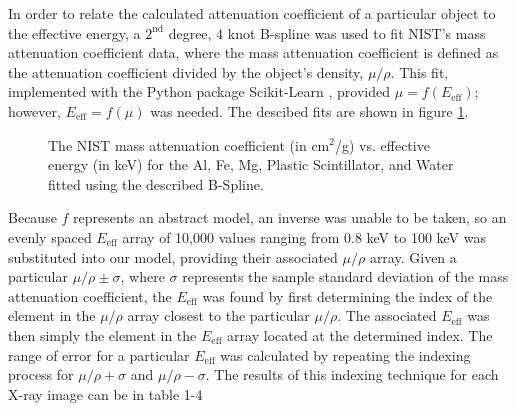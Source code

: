 In order to relate the calculated attenuation coefficient of a particular object to the effective energy, a $2^\text{nd}$ degree, 4 knot B-spline was used to fit NIST's mass attenuation coefficient data, where the mass attenuation coefficient is defined as the attenuation coefficient divided by the object's density, $\mu/\rho$. This fit, implemented with the Python package Scikit-Learn \cite{scikit-learn}, provided $\mu = f(E_{\text{eff}})$; however, $E_{\text{eff}} = f(\mu)$ was needed. The descibed fits are shown in figure \ref{figure:NISTSplineFit}.


\begin{figure}[htbp]
    \centering
\end{figure}

\begin{figure}[htbp]
    \addtocounter{subfigure}{2}
    \ContinuedFloat
    \addtocounter{figure}{1}
    \centering
    \caption{The NIST mass attenuation coefficient (in cm$^2$/g) vs. effective energy (in keV) for the Al, Fe, Mg, Plastic Scintillator, and Water fitted using the described B-Spline.}
    \label{figure:NISTSplineFit}
\end{figure}

\newpage
Because $f$ represents an abstract model, an inverse was unable to be taken, so an evenly spaced $E_{\text{eff}}$ array of 10,000 values ranging from 0.8 keV to 100 keV was substituted into our model, providing their associated $\mu/\rho$ array. Given a particular $\mu/\rho \pm \sigma$, where $\sigma$ represents the sample standard deviation of the mass attenuation coefficient, the $E_{\text{eff}}$ was found by first determining the index of the element in the $\mu/\rho$ array closest to the particular $\mu/\rho$. The associated $E_{\text{eff}}$ was then simply the element in the $E_{\text{eff}}$ array located at the determined index. The range of error for a particular $E_{\text{eff}}$ was calculated by repeating the indexing process for $\mu/\rho + \sigma$ and $\mu/\rho - \sigma$. The results of this indexing technique for each X-ray image can be in table 1-4

